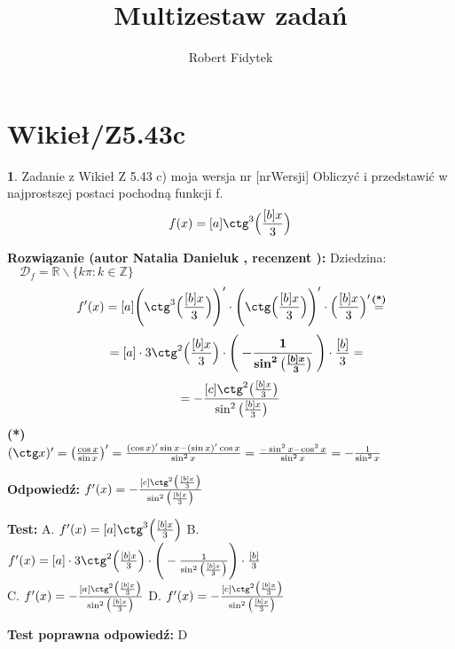 \documentclass[12pt, a4paper]{article}
\title{Multizestaw zadań}
\author{Robert Fidytek}
\date{}
\theoremstyle{definition} %
\newtheorem{zad}{}
\newcommand{\kategoria}[1]{\section{#1}} %
\newcommand{\zadStart}[1]{\begin{zad}#1\newline} %
\newcommand{\zadStop}{\end{zad}}   %
\newcommand{\rozwStart}[2]{\noindent \textbf{Rozwiązanie (autor #1 , recenzent #2): }\newline} %
\newcommand{\rozwStop}{\newline}                                            %
\newcommand{\odpStart}{\noindent \textbf{Odpowiedź:}\newline}    %
\newcommand{\odpStop}{\newline}                                             %
\newcommand{\testStart}{\noindent \textbf{Test:}\newline} %
\newcommand{\testStop}{\newline} %
\newcommand{\kluczStart}{\noindent \textbf{Test poprawna odpowiedź:}\newline} %
\newcommand{\kluczStop}{\newline} %
\begin{document}
\maketitle

\kategoria{Wikieł/Z5.43c}

\zadStart{Zadanie z Wikieł Z 5.43 c) moja wersja nr [nrWersji]}
Obliczyć i przedstawić w najprostszej postaci pochodną funkcji f.
$$f(x) = [a]\ctg^3\Big(\frac{[b]x}{3}\Big)$$
\zadStop

\rozwStart{Natalia Danieluk}{}
Dziedzina: $\quad \mathcal{D}_f=\mathbb{R}\backslash\{k\pi : k \in \mathbb{Z} \}$
$$f'(x) = [a]\Bigg(\ctg^3\Big(\frac{[b]x}{3}\Big)\Bigg)' \cdot \Bigg(\ctg\Big(\frac{[b]x}{3}\Big)\Bigg)' \cdot \Big(\frac{[b]x}{3}\Big)' 
\mathrel{\stackrel{\makebox[0pt]{\mbox{\normalfont\scriptsize\textbf{(*)}}}}{=}}$$
$$\quad= [a] \cdot 3 \ctg^2\Big(\frac{[b]x}{3}\Big) \cdot \Bigg(\boldsymbol{-\frac{1}{\sin^2\big(\frac{[b]x}{3}\big)}}\Bigg) \cdot \frac{[b]}{3} =$$
$$= -\frac{[c]\ctg^2\big(\frac{[b]x}{3}\big)}{\sin^2\big(\frac{[b]x}{3}\big)}$$
{\normalfont\scriptsize\textbf{(*)}\\
$(\ctg x)' = \big(\frac{\cos x}{\sin x} \big)' = \frac{(\cos x)'\sin x - (\sin x)'\cos x}{\sin^2 x} = \frac{-\sin^2 x - \cos^2 x}{\sin^2 x} = -\frac{1}{\sin^2 x}$}
\rozwStop

\odpStart
$f'(x) = -\frac{[c]\ctg^2\big(\frac{[b]x}{3}\big)}{\sin^2\big(\frac{[b]x}{3}\big)}$
\odpStop

\testStart
A. $f'(x) = [a]\ctg^3\Big(\frac{[b]x}{3}\Big)$
B. $f'(x) = [a] \cdot 3 \ctg^2\Big(\frac{[b]x}{3}\Big) \cdot \Bigg(-\frac{1}{\sin^2\big(\frac{[b]x}{3}\big)}\Bigg) \cdot \frac{[b]}{3}$\\
C. $f'(x) = -\frac{[a]\ctg^2\big(\frac{[b]x}{3}\big)}{\sin^2\big(\frac{[b]x}{3}\big)}$
D. $f'(x) = -\frac{[c]\ctg^2\big(\frac{[b]x}{3}\big)}{\sin^2\big(\frac{[b]x}{3}\big)}$
\testStop

\kluczStart
D
\kluczStop
\end{document}
